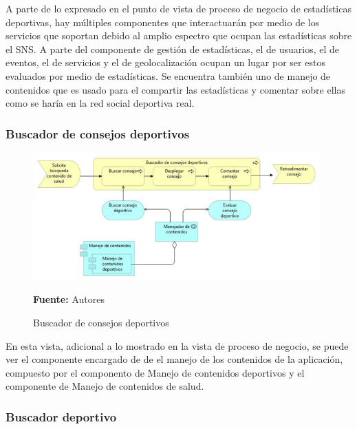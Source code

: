 A parte de lo expresado en el punto de vista de proceso de negocio de estadísticas deportivas, hay múltiples componentes que interactuarán por medio de los servicios que soportan debido al amplio espectro que ocupan las estadísticas sobre el SNS. A parte del componente de gestión de estadísticas, el de usuarios, el de eventos, el de servicios y el de geolocalización ocupan un lugar por ser estos evaluados por medio de estadísticas. Se encuentra también uno de manejo de contenidos que es usado para el compartir las estadísticas y comentar sobre ellas como se haría en la red social deportiva real.

\subsubsection{Buscador de consejos deportivos}

\begin{figure}[!htb]
  \begin{center}
    \includegraphics[width=11cm]{./imagenes/Archimate/vistas/application_usage/buscadorconsejosdeportivos.png}
    \caption{Buscador de consejos deportivos}
    \label{fig:BP_BuscadorConsejosDeportivos}
    \textbf{Fuente:}  Autores
  \end{center}
\end{figure}

En esta vista, adicional a lo mostrado en la vista de proceso de negocio, se puede ver el componente encargado de de el manejo de los contenidos de la aplicación, compuesto por el componento de Manejo de contenidos deportivos y el componente de Manejo de contenidos de salud.

\subsubsection{Buscador deportivo}

